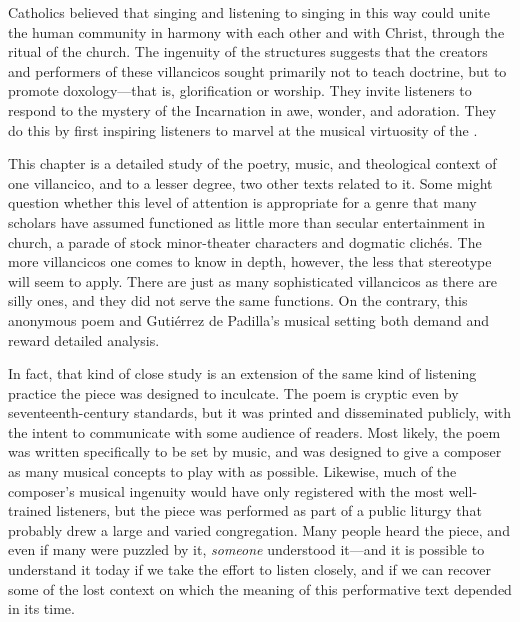Catholics believed that singing and listening to singing in this way could unite
the human community in harmony with each other and with Christ, through the
ritual of the church.
The ingenuity of the structures suggests that the creators and performers of
these villancicos sought primarily not to teach doctrine, but to promote
doxology---that is, glorification or worship.
They invite listeners to respond to the mystery of the Incarnation in awe,
wonder, and adoration. 
They do this by first inspiring listeners to marvel at the musical virtuosity of
the .

This chapter is a detailed study of the poetry, music, and theological context
of one villancico, and to a lesser degree, two other texts related to it.
Some might question whether this level of attention is appropriate for a genre
that many scholars have assumed functioned as little more than secular
entertainment in church, a parade of stock minor-theater characters and
dogmatic clichés.
The more villancicos one comes to know in depth, however, the less that
stereotype will seem to apply.
There are just as many sophisticated villancicos as there are silly ones, and
they did not serve the same functions.
On the contrary, this anonymous poem and Gutiérrez de Padilla's musical setting
both demand and reward detailed analysis.

In fact, that kind of close study is an extension of the same kind of listening
practice the piece was designed to inculcate.
The poem is cryptic even by seventeenth-century standards, but it was printed
and disseminated publicly, with the intent to communicate with some audience of
readers.
Most likely, the poem was written specifically to be set by music, and was
designed to give a composer as many musical concepts to play with as possible.
Likewise, much of the composer's musical ingenuity would have only registered
with the most well-trained listeners, but the piece was performed as part of a
public liturgy that probably drew a large and varied congregation.
Many people heard the piece, and even if many were puzzled by it, \emph{someone}
understood it---and it is possible to understand it today if we take the effort
to listen closely, and if we can recover some of the lost context on which the
meaning of this performative text depended in its time.


